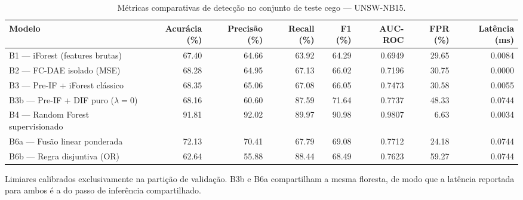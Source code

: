 \begin{table}[htbp]
\centering
\caption{Métricas comparativas de detecção no conjunto de teste cego — UNSW-NB15.}
\label{tab:tabela4-unsw-nb15}
\small
\begin{tabular}{lrrrrrrr}
\hline
Modelo & Acurácia (\%) & Precisão (\%) & Recall (\%) & F1 (\%) & AUC-ROC & FPR (\%) & Latência (ms) \\
\hline
B1 — iForest (features brutas) & 67.40 & 64.66 & 63.92 & 64.29 & 0.6949 & 29.65 & 0.0084 \\
B2 — FC-DAE isolado (MSE) & 68.28 & 64.95 & 67.13 & 66.02 & 0.7196 & 30.75 & 0.0000 \\
B3 — Pre-IF + iForest clássico & 68.35 & 65.06 & 67.08 & 66.05 & 0.7473 & 30.58 & 0.0055 \\
B3b — Pre-IF + DIF puro ($\lambda = 0$) & 68.16 & 60.60 & 87.59 & 71.64 & 0.7737 & 48.33 & 0.0744 \\
B4 — Random Forest supervisionado & 91.81 & 92.02 & 89.97 & 90.98 & 0.9807 & 6.63 & 0.0034 \\
B6a — Fusão linear ponderada & 72.13 & 70.41 & 67.79 & 69.08 & 0.7712 & 24.18 & 0.0744 \\
B6b — Regra disjuntiva (OR) & 62.64 & 55.88 & 88.44 & 68.49 & 0.7623 & 59.27 & 0.0744 \\
\hline
\end{tabular}
\begin{flushleft}\footnotesize Limiares calibrados exclusivamente na partição de validação. B3b e B6a compartilham a mesma floresta, de modo que a latência reportada para ambos é a do passo de inferência compartilhado.\end{flushleft}
\end{table}
